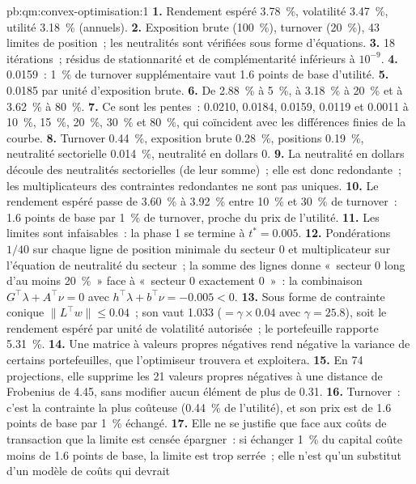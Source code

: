 \begin{solution}{pb:qm:convex-optimisation:1}
\textbf{1.} Rendement espéré 3.78~\%, volatilité 3.47~\%, utilité 3.18~\% (annuels).
\textbf{2.} Exposition brute (100~\%), turnover (20~\%), 43 limites de position~; les neutralités sont vérifiées sous forme d'équations.
\textbf{3.} 18 itérations~; résidus de stationnarité et de complémentarité inférieurs à $10^{-9}$.
\textbf{4.} 0.0159~: 1~\% de turnover supplémentaire vaut 1.6 points de base d'utilité.
\textbf{5.} 0.0185 par unité d'exposition brute.
\textbf{6.} De 2.88~\% à 5~\%, à 3.18~\% à 20~\% et à 3.62~\% à 80~\%.
\textbf{7.} Ce sont les pentes~: 0.0210, 0.0184, 0.0159, 0.0119 et 0.0011 à 10~\%, 15~\%, 20~\%, 30~\% et 80~\%, qui coïncident avec les différences finies de la courbe.
\textbf{8.} Turnover 0.44~\%, exposition brute 0.28~\%, positions 0.19~\%, neutralité sectorielle 0.014~\%, neutralité en dollars 0.
\textbf{9.} La neutralité en dollars découle des neutralités sectorielles (de leur somme)~; elle est donc redondante~; les multiplicateurs des contraintes redondantes ne sont pas uniques.
\textbf{10.} Le rendement espéré passe de 3.60~\% à 3.92~\% entre 10~\% et 30~\% de turnover~: 1.6 points de base par 1~\% de turnover, proche du prix de l'utilité.
\textbf{11.} Les limites sont infaisables~: la phase 1 se termine à $t^* = 0.005$.
\textbf{12.} Pondérations $1/40$ sur chaque ligne de position minimale du secteur 0 et multiplicateur sur l'équation de neutralité du secteur~; la somme des lignes donne «~secteur 0 long d'au moins 20~\%~» face à «~secteur 0 exactement
0~»~: la combinaison $G^\top\lambda + A^\top\nu = 0$ avec $h^\top\lambda + b^\top\nu = -0.005 < 0$.
\textbf{13.} Sous forme de contrainte conique $\lVert L^\top w\rVert \le 0.04$~; son  vaut 1.033 ($= \gamma \times 0.04$ avec $\gamma = 25.8$), soit le rendement espéré par unité de volatilité autorisée~; le portefeuille rapporte 5.31~\%.
\textbf{14.} Une matrice à valeurs propres négatives rend négative la variance de certains portefeuilles, que l'optimiseur trouvera et exploitera.
\textbf{15.} En 74 projections, elle supprime les 21 valeurs propres négatives à une distance de Frobenius de 4.45, sans modifier aucun élément de plus de 0.31.
\textbf{16.} Turnover~: c'est la contrainte la plus coûteuse (0.44~\% de l'utilité), et son prix est de 1.6 points de base par 1~\% échangé.
\textbf{17.} Elle ne se justifie que face aux coûts de transaction que la limite est censée épargner~: si échanger 1~\% du capital coûte moins de 1.6 points de base, la limite est trop serrée~; elle n'est qu'un substitut d'un modèle de coûts qui devrait

\end{solution}
